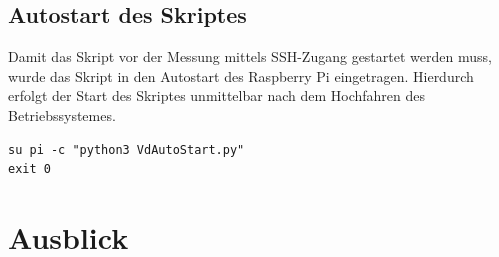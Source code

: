 \documentclass[a4paper,12pt,bibliography=totoc, listof=totoc,titlepage,pointlessnumbers]{scrreprt}
\begin{document}
\section{Autostart des Skriptes}
Damit das Skript vor der Messung mittels SSH-Zugang gestartet werden muss, wurde das Skript in den Autostart des Raspberry Pi eingetragen. Hierdurch erfolgt der Start des Skriptes unmittelbar nach dem Hochfahren des Betriebssystemes.

\begin{lstlisting}[caption={Startskript startVLP.sh}, label={startskript}]
su pi -c "python3 VdAutoStart.py"
exit 0
\end{lstlisting}


\chapter{Ausblick}
\label{c:ausblick}


\renewcommand\UrlFont\itshape


\listoffigures
\listoftables
\end{document}
